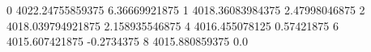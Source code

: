 0 4022.24755859375 6.36669921875
1 4018.36083984375 2.47998046875
2 4018.039794921875 2.158935546875
4 4016.455078125 0.57421875
6 4015.607421875 -0.2734375
8 4015.880859375 0.0
